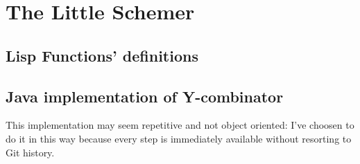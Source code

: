 \documentclass[twoside,openright,titlepage,fleqn,
	headinclude,11pt,a4paper,BCOR5mm,footinclude
	]{scrbook}
\begin{document}
\frenchspacing
\raggedbottom
{}
\pagestyle{plain}

\pagestyle{scrheadings}

\lstset{
	language = Lisp
	, numbers = right
	, basicstyle=\footnotesize
	, frame=tlbr
	, tabsize=2
	, captionpos=b
	, breaklines=true
	, showspaces=false
	, showstringspaces=false
}

\tableofcontents

\newpage

\chapter{The Little Schemer}
\label{chap:the-little-schemer}

\section{Lisp Functions' definitions}
\label{sec:functions-definitions}


% 

\section{Java implementation of Y-combinator}
\label{sec:java-implementation-of-y-combinator}
This implementation may seem repetitive and not object oriented: I've
choosen to do it in this way because every step is immediately
available without resorting to Git history.











\end{document}
